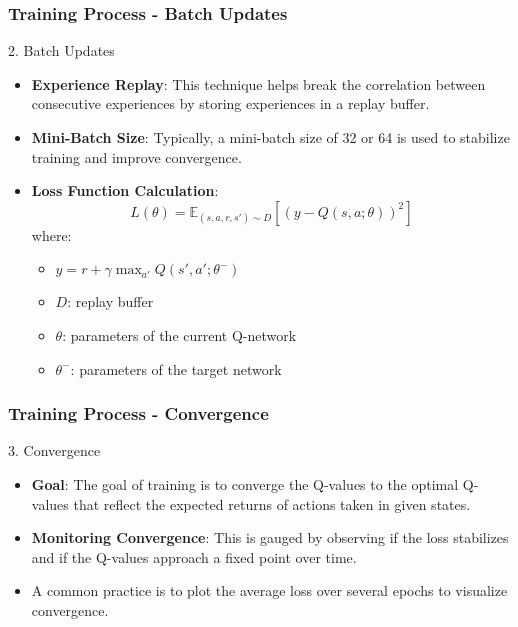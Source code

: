 \documentclass{beamer}
\begin{document}
\begin{frame}[fragile]
    \frametitle{Training Process - Batch Updates}
    \begin{block}{2. Batch Updates}
        \begin{itemize}
            \item \textbf{Experience Replay}: This technique helps break the correlation between consecutive experiences by storing experiences in a replay buffer.
            \item \textbf{Mini-Batch Size}: Typically, a mini-batch size of 32 or 64 is used to stabilize training and improve convergence.
            \item \textbf{Loss Function Calculation}:
            \begin{equation}
            L(\theta) = \mathbb{E}_{(s,a,r,s') \sim D} \left[ \left( y - Q(s, a; \theta) \right)^2 \right]
            \end{equation}
            where:
            \begin{itemize}
                \item \( y = r + \gamma \max_{a'} Q(s', a'; \theta^{-}) \)  
                \item \( D \): replay buffer
                \item \( \theta \): parameters of the current Q-network
                \item \( \theta^{-} \): parameters of the target network
            \end{itemize}
        \end{itemize}
    \end{block}
\end{frame}

\begin{frame}[fragile]
    \frametitle{Training Process - Convergence}
    \begin{block}{3. Convergence}
        \begin{itemize}
            \item \textbf{Goal}: The goal of training is to converge the Q-values to the optimal Q-values that reflect the expected returns of actions taken in given states.
            \item \textbf{Monitoring Convergence}: This is gauged by observing if the loss stabilizes and if the Q-values approach a fixed point over time.
            \item A common practice is to plot the average loss over several epochs to visualize convergence.
        \end{itemize}
    \end{block}
\end{frame}
\end{document}
